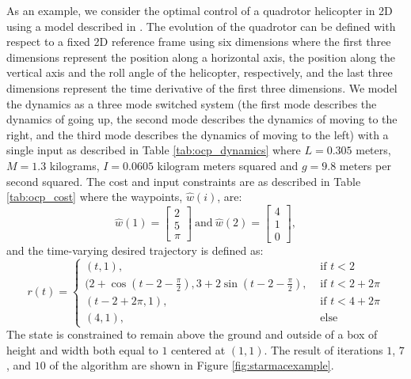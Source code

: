As an example, we consider the optimal control of a quadrotor helicopter in 2D using a model described in \cite{gillula2011applications}. The evolution of the quadrotor can be defined with respect to a fixed 2D reference frame using six dimensions where the first three dimensions represent the position along a horizontal axis, the position along the vertical axis and the roll angle of the helicopter, respectively, and the last three dimensions represent the time derivative of the first three dimensions. We model the dynamics as a three mode switched system (the first mode describes the dynamics of going up, the second mode describes the dynamics of moving to the right, and the third mode describes the dynamics of moving to the left) with a single input as described in Table \ref{tab:ocp_dynamics} where $L = 0.305$ meters, $M = 1.3$ kilograms, $I = 0.0605$ kilogram meters squared and $g = 9.8$ meters per second squared. The cost and input constraints are as described in Table \ref{tab:ocp_cost} where the waypoints, $\hat{w}(i)$, are:
\begin{equation}
	\hat{w}(1) = 
  \begin{bmatrix} 
    2 \\ 5 \\ \pi 
  \end{bmatrix} 
  \ \text{and}\  
  \hat{w}(2) = 
  \begin{bmatrix} 
    4 \\ 1 \\ 0 
  \end{bmatrix},	
\end{equation}
and the time-varying desired trajectory is defined as:
\begin{equation}
	r(t) = 
	\begin{cases}
		(t,1), & \mbox{ if } t < 2 \\ 
		(2+\cos\left(t - 2 - \frac{\pi}{2}\right), 3+2\sin\left(t - 2 - \frac{\pi}{2}\right), & \mbox{ if } t < 2 + 2\pi \\
		(t-2+2\pi,1), & \mbox{ if } t < 4 + 2\pi \\
		(4,1), & \mbox{ else }
	\end{cases}
\end{equation}
The state is constrained to remain above the ground and outside of a box of height and width both equal to $1$ centered at $(1,1)$. The result of iterations $1$, $7$, and $10$ of the algorithm are shown in Figure \ref{fig:starmacexample}.


